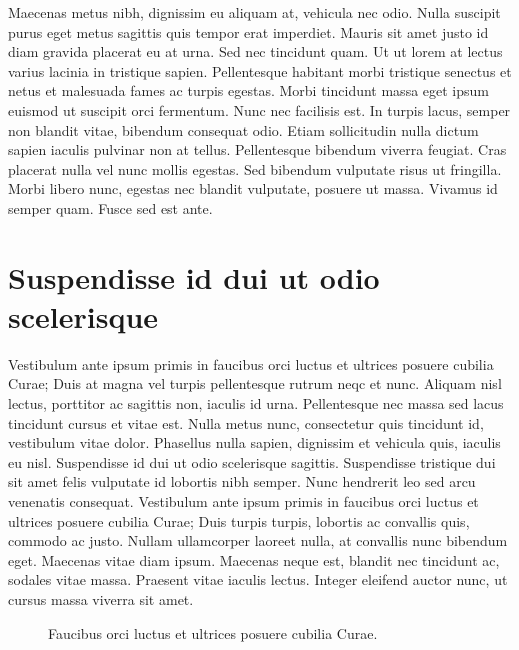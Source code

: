 \documentclass{EPUProjetDi}
\begin{document}
Maecenas metus nibh, dignissim eu aliquam at, vehicula nec odio. Nulla suscipit purus eget metus sagittis quis tempor erat imperdiet. Mauris sit amet justo id diam gravida placerat eu at urna. Sed nec tincidunt quam. Ut ut lorem at lectus varius lacinia in tristique sapien. Pellentesque habitant morbi tristique senectus et netus et malesuada fames ac turpis egestas. Morbi tincidunt massa eget ipsum euismod ut suscipit orci fermentum. Nunc nec facilisis est. In turpis lacus, semper non blandit vitae, bibendum consequat odio. Etiam sollicitudin nulla dictum sapien iaculis pulvinar non at tellus. Pellentesque bibendum viverra feugiat. Cras placerat nulla vel nunc mollis egestas. Sed bibendum vulputate risus ut fringilla. Morbi libero nunc, egestas nec blandit vulputate, posuere ut massa. Vivamus id semper quam. Fusce sed est ante.

\section{Suspendisse id dui ut odio scelerisque} 

Vestibulum ante ipsum primis in faucibus orci luctus et ultrices posuere cubilia Curae; Duis at magna vel turpis pellentesque rutrum neqc et nunc. Aliquam nisl lectus, porttitor ac sagittis non, iaculis id urna. Pellentesque nec massa sed lacus tincidunt cursus et vitae est. Nulla metus nunc, consectetur quis tincidunt id, vestibulum vitae dolor. Phasellus nulla sapien, dignissim et vehicula quis, iaculis eu nisl. Suspendisse id dui ut odio scelerisque sagittis. Suspendisse tristique dui sit amet felis vulputate id lobortis nibh semper. Nunc hendrerit leo sed arcu venenatis consequat. Vestibulum ante ipsum primis in faucibus orci luctus et ultrices posuere cubilia Curae; Duis turpis turpis, lobortis ac convallis quis, commodo ac justo. Nullam ullamcorper laoreet nulla, at convallis nunc bibendum eget. Maecenas vitae diam ipsum. Maecenas neque est, blandit nec tincidunt ac, sodales vitae massa. Praesent vitae iaculis lectus. Integer eleifend auctor nunc, ut cursus massa viverra sit amet.

\begin{figure}[ht]
\begin{center}
\end{center}
\caption{Faucibus orci luctus et ultrices posuere cubilia Curae.}
\label{fig:Faucibus}
\end{figure}
\end{document}
